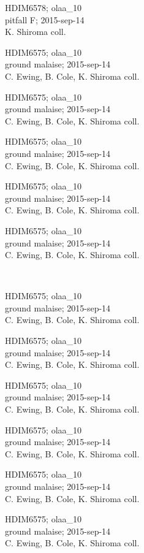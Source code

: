 \documentclass[2pt]{extarticle}
\begin{document}
\noindent
\parbox{0.16\textwidth}{\tiny \raggedright \rule[-0.3\baselineskip]{0pt}{10pt}HDIM6578; olaa\_10\\ pitfall F; 2015-sep-14\\ K. Shiroma coll.}
\parbox{0.16\textwidth}{\tiny \raggedright \rule[-0.3\baselineskip]{0pt}{10pt}HDIM6575; olaa\_10\\ ground malaise; 2015-sep-14\\ C. Ewing, B. Cole, K. Shiroma coll.}
\parbox{0.16\textwidth}{\tiny \raggedright \rule[-0.3\baselineskip]{0pt}{10pt}HDIM6575; olaa\_10\\ ground malaise; 2015-sep-14\\ C. Ewing, B. Cole, K. Shiroma coll.}
\parbox{0.16\textwidth}{\tiny \raggedright \rule[-0.3\baselineskip]{0pt}{10pt}HDIM6575; olaa\_10\\ ground malaise; 2015-sep-14\\ C. Ewing, B. Cole, K. Shiroma coll.}
\parbox{0.16\textwidth}{\tiny \raggedright \rule[-0.3\baselineskip]{0pt}{10pt}HDIM6575; olaa\_10\\ ground malaise; 2015-sep-14\\ C. Ewing, B. Cole, K. Shiroma coll.}
\parbox{0.16\textwidth}{\tiny \raggedright \rule[-0.3\baselineskip]{0pt}{10pt}HDIM6575; olaa\_10\\ ground malaise; 2015-sep-14\\ C. Ewing, B. Cole, K. Shiroma coll.} \\ 
\vspace{0.001in} 

\noindent
\parbox{0.16\textwidth}{\tiny \raggedright \rule[-0.3\baselineskip]{0pt}{10pt}HDIM6575; olaa\_10\\ ground malaise; 2015-sep-14\\ C. Ewing, B. Cole, K. Shiroma coll.}
\parbox{0.16\textwidth}{\tiny \raggedright \rule[-0.3\baselineskip]{0pt}{10pt}HDIM6575; olaa\_10\\ ground malaise; 2015-sep-14\\ C. Ewing, B. Cole, K. Shiroma coll.}
\parbox{0.16\textwidth}{\tiny \raggedright \rule[-0.3\baselineskip]{0pt}{10pt}HDIM6575; olaa\_10\\ ground malaise; 2015-sep-14\\ C. Ewing, B. Cole, K. Shiroma coll.}
\parbox{0.16\textwidth}{\tiny \raggedright \rule[-0.3\baselineskip]{0pt}{10pt}HDIM6575; olaa\_10\\ ground malaise; 2015-sep-14\\ C. Ewing, B. Cole, K. Shiroma coll.}
\parbox{0.16\textwidth}{\tiny \raggedright \rule[-0.3\baselineskip]{0pt}{10pt}HDIM6575; olaa\_10\\ ground malaise; 2015-sep-14\\ C. Ewing, B. Cole, K. Shiroma coll.}
\parbox{0.16\textwidth}{\tiny \raggedright \rule[-0.3\baselineskip]{0pt}{10pt}HDIM6575; olaa\_10\\ ground malaise; 2015-sep-14\\ C. Ewing, B. Cole, K. Shiroma coll.} \\ 
\vspace{0.001in} 
\end{document}
